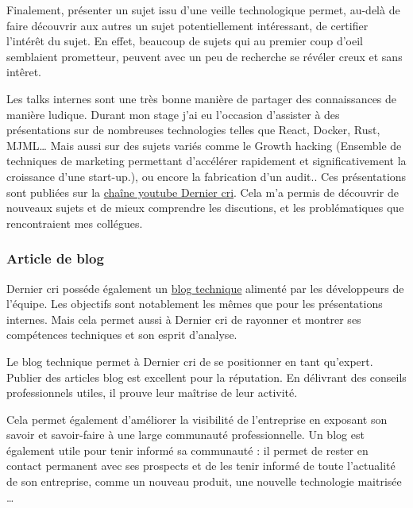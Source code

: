 \documentclass[12pt,a4paper]{article}
\begin{document}
  \bigskip

  Finalement, présenter un sujet issu d'une veille technologique permet,
  au-delà de faire découvrir aux autres un sujet potentiellement
  intéressant, de certifier l'intérêt du sujet. En effet, beaucoup de
  sujets qui au premier coup d'oeil semblaient prometteur, peuvent avec un
  peu de recherche se révéler creux et sans intêret.

  \bigskip

  Les talks internes sont une très bonne manière de partager des
  connaissances de manière ludique. Durant mon stage j'ai eu l'occasion
  d'assister à des présentations sur de nombreuses technologies telles que
  React, Docker, Rust, MJML\ldots{} Mais aussi sur des sujets variés comme
  le Growth hacking (Ensemble de techniques de marketing permettant
  d'accélérer rapidement et significativement la croissance d'une
  start-up.), ou encore la fabrication d'un audit.. Ces présentations sont
  publiées sur la
  \href{https://www.youtube.com/channel/UCDfdBlzldhg_PEu3xZTPsHg}{chaîne
  youtube Dernier cri}. Cela m'a permis de découvrir de nouveaux sujets et
  de mieux comprendre les discutions, et les problématiques que
  rencontraient mes collégues.

  \bigskip

  \subsubsection{Article de blog}\label{article-de-blog}

  \bigskip

  Dernier cri posséde également un
  \href{http://derniercri.io/tech-blog}{blog technique} alimenté par les
  développeurs de l'équipe. Les objectifs sont notablement les mêmes que
  pour les présentations internes. Mais cela permet aussi à Dernier cri de
  rayonner et montrer ses compétences techniques et son esprit d'analyse.

  \bigskip

  Le blog technique permet à Dernier cri de se positionner en tant
  qu'expert. Publier des articles blog est excellent pour la réputation.
  En délivrant des conseils professionnels utiles, il prouve leur maîtrise
  de leur activité.

  \bigskip

  Cela permet également d'améliorer la visibilité de l'entreprise en
  exposant son savoir et savoir-faire à une large communauté
  professionnelle. Un blog est également utile pour tenir informé sa
  communauté : il permet de rester en contact permanent avec ses prospects
  et de les tenir informé de toute l'actualité de son entreprise, comme un
  nouveau produit, une nouvelle technologie maitrisée \ldots{}
\end{document}
